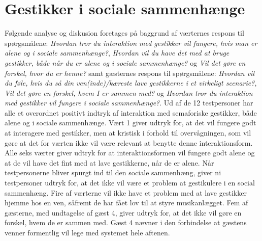 \section{Gestikker i sociale sammenhænge}
\label{TestresultaterSocialAcceptSocial}
%
Følgende analyse og diskusion foretages på baggrund af værternes respons til spørgsmålene: \textit{Hvordan tror du interaktion med gestikker vil fungere, hvis man er alene og i sociale sammenhænge?}, \textit{Hvordan vil du have det med at bruge gestikker, både når du er alene og i sociale sammenhænge?} og \textit{Vil det gøre en forskel, hvor du er henne?} samt gæsternes respons til spørgsmålene: \textit{Hvordan vil du føle, hvis du så din ven(inde)/kæreste lave gestikkerne i et virkeligt scenarie?}, \textit{Vil det gøre en forskel, hvem I er sammen med?} og \textit{Hvordan tror du interaktion med gestikker vil fungere i sociale sammenhænge?}. \blankline
%
Ud af de 12 testpersoner har alle et overordnet positivt indtryk af interaktion med semaforiske gestikker, både alene og i sociale sammenhænge. Vært 1 giver udtryk for, at det vil fungere godt at interagere med gestikker, men at kristisk i forhold til overvågningen, som vil gøre at det for værten ikke vil være relevant at benytte denne interaktionsform. Alle seks værter giver udtryk for at interaktionsformen vil fungere godt alene og at de vil have det fint med at lave gestikkerne, når de er alene. Når testpersonerne bliver spurgt ind til den sociale sammenhæng, giver ni testpersoner udtryk for, at det ikke vil være et problem at gestikulere i en social sammenhæng. Fire af værterne vil ikke have et problem med at lave gestikker hjemme hos en ven, såfremt de har fået lov til at styre musikanlægget. Fem af gæsterne, med undtagelse af gæst 4, giver udtryk for, at det ikke vil gøre en forskel, hvem de er sammen med. Gæst 4 nævner i den forbindelse at gæstens venner formentlig vil lege med systemet hele aftenen. 

